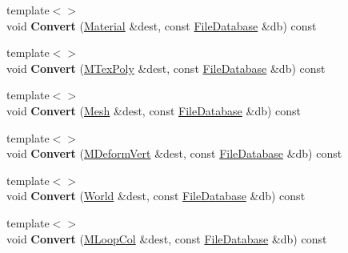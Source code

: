 \begin{DoxyCompactItemize}
\item 
\hypertarget{class_assimp_1_1_blender_1_1_structure_affc3a881034e9cd9f8b4112e871131da}{{\footnotesize template$<$$>$ }\\void {\bfseries Convert} (\hyperlink{struct_assimp_1_1_blender_1_1_material}{Material} \&dest, const \hyperlink{class_assimp_1_1_blender_1_1_file_database}{File\+Database} \&db) const }\label{class_assimp_1_1_blender_1_1_structure_affc3a881034e9cd9f8b4112e871131da}

\item 
\hypertarget{class_assimp_1_1_blender_1_1_structure_a1f782b46753ee065fea51fd78f843f7d}{{\footnotesize template$<$$>$ }\\void {\bfseries Convert} (\hyperlink{struct_assimp_1_1_blender_1_1_m_tex_poly}{M\+Tex\+Poly} \&dest, const \hyperlink{class_assimp_1_1_blender_1_1_file_database}{File\+Database} \&db) const }\label{class_assimp_1_1_blender_1_1_structure_a1f782b46753ee065fea51fd78f843f7d}

\item 
\hypertarget{class_assimp_1_1_blender_1_1_structure_a535309160ec0cad3f79aabf978cdfeed}{{\footnotesize template$<$$>$ }\\void {\bfseries Convert} (\hyperlink{struct_assimp_1_1_blender_1_1_mesh}{Mesh} \&dest, const \hyperlink{class_assimp_1_1_blender_1_1_file_database}{File\+Database} \&db) const }\label{class_assimp_1_1_blender_1_1_structure_a535309160ec0cad3f79aabf978cdfeed}

\item 
\hypertarget{class_assimp_1_1_blender_1_1_structure_a9c5edb5cce1a7e3e9097e7240ed371a2}{{\footnotesize template$<$$>$ }\\void {\bfseries Convert} (\hyperlink{struct_assimp_1_1_blender_1_1_m_deform_vert}{M\+Deform\+Vert} \&dest, const \hyperlink{class_assimp_1_1_blender_1_1_file_database}{File\+Database} \&db) const }\label{class_assimp_1_1_blender_1_1_structure_a9c5edb5cce1a7e3e9097e7240ed371a2}

\item 
\hypertarget{class_assimp_1_1_blender_1_1_structure_a419e150d969067ca3e9ba39769f62d06}{{\footnotesize template$<$$>$ }\\void {\bfseries Convert} (\hyperlink{struct_assimp_1_1_blender_1_1_world}{World} \&dest, const \hyperlink{class_assimp_1_1_blender_1_1_file_database}{File\+Database} \&db) const }\label{class_assimp_1_1_blender_1_1_structure_a419e150d969067ca3e9ba39769f62d06}

\item 
\hypertarget{class_assimp_1_1_blender_1_1_structure_aabaf340a66b8efd9b808f2ff224d56fd}{{\footnotesize template$<$$>$ }\\void {\bfseries Convert} (\hyperlink{struct_assimp_1_1_blender_1_1_m_loop_col}{M\+Loop\+Col} \&dest, const \hyperlink{class_assimp_1_1_blender_1_1_file_database}{File\+Database} \&db) const }\label{class_assimp_1_1_blender_1_1_structure_aabaf340a66b8efd9b808f2ff224d56fd}


\end{DoxyCompactItemize}
